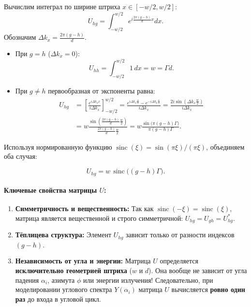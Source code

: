 \documentclass[a4paper,11pt]{article}
\begin{document}
Вычислим интеграл по ширине штриха $x \in [-w/2, w/2]$:
\begin{equation}
    U_{hg} = \int_{-w/2}^{w/2} e^{i \frac{2\pi (g - h)}{d} x} dx.
\end{equation}
Обозначим $\Delta k_x = \frac{2\pi (g - h)}{d}$. 
\begin{itemize}
    \item При $g = h$ ($\Delta k_x = 0$):
    \begin{equation}
        U_{hh} = \int_{-w/2}^{w/2} 1 \, dx = w = \Gamma d.
    \end{equation}
    \item При $g \ne h$ первообразная от экспоненты равна:
    \begin{align}
        U_{hg} &= \left[ \frac{e^{i \Delta k_x x}}{i \Delta k_x} \right]_{-w/2}^{w/2} = \frac{e^{i \Delta k_x \frac{w}{2}} - e^{-i \Delta k_x \frac{w}{2}}}{i \Delta k_x} = \frac{2i \sin\left(\Delta k_x \frac{w}{2}\right)}{i \Delta k_x} \nonumber \\
        &= w \frac{\sin\left( \frac{2\pi(g - h)}{d} \frac{w}{2} \right)}{\frac{2\pi(g - h)}{d} \frac{w}{2}} = w \frac{\sin\big( \pi (g - h) \Gamma \big)}{\pi (g - h) \Gamma}.
    \end{align}
\end{itemize}
Используя нормированную функцию $\operatorname{sinc}(\xi) = \sin(\pi \xi)/(\pi \xi)$, объединяем оба случая:
\begin{mathbox}
\begin{equation}
    U_{hg} = w \, \operatorname{sinc}\big( (g - h) \Gamma \big).
    \label{eq:matrix_U_analytic}
\end{equation}
\end{mathbox}

\paragraph{Ключевые свойства матрицы $U$:}
\begin{enumerate}
    \item \textbf{Симметричность и вещественность:} Так как $\operatorname{sinc}(-\xi) = \operatorname{sinc}(\xi)$, матрица является вещественной и строго симметричной: $U_{hg} = U_{gh} = U_{hg}^*$.
    \item \textbf{Тёплицева структура:} Элемент $U_{hg}$ зависит только от разности индексов $(g - h)$.
    \item \textbf{Независимость от угла и энергии:} Матрица $U$ определяется \textbf{исключительно геометрией штриха} ($w$ и $d$). Она вообще не зависит от угла падения $\alpha_i$, азимута $\phi$ или энергии излучения! Следовательно, при моделировании углового спектра $Y(\alpha_i)$ матрица $U$ вычисляется \textbf{ровно один раз} до входа в угловой цикл.
\end{enumerate}
\end{document}
